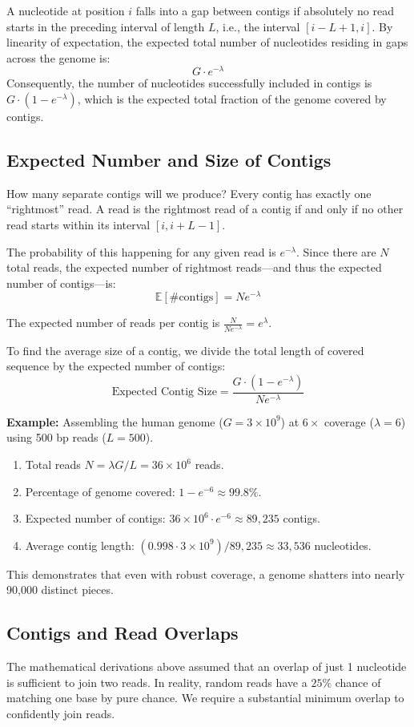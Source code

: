 A nucleotide at position $i$ falls into a gap between contigs if absolutely no read starts in the preceding interval of length $L$, i.e., the interval $[i-L+1, i]$. By linearity of expectation, the expected total number of nucleotides residing in gaps across the genome is:
\[ G \cdot e^{-\lambda} \]
Consequently, the number of nucleotides successfully included in contigs is $G \cdot (1 - e^{-\lambda})$, which is the expected total fraction of the genome covered by contigs.

\subsection{Expected Number and Size of Contigs}
How many separate contigs will we produce? Every contig has exactly one ``rightmost'' read. A read is the rightmost read of a contig if and only if no other read starts within its interval $[i, i+L-1]$.

The probability of this happening for any given read is $e^{-\lambda}$. Since there are $N$ total reads, the expected number of rightmost reads—and thus the expected number of contigs—is:
\[ \mathbb{E}[\#\text{contigs}] = N e^{-\lambda} \]

The expected number of reads per contig is $\frac{N}{N e^{-\lambda}} = e^\lambda$.

To find the average size of a contig, we divide the total length of covered sequence by the expected number of contigs:
\[ \text{Expected Contig Size} = \frac{G \cdot (1 - e^{-\lambda})}{N e^{-\lambda}} \]

\textbf{Example:} Assembling the human genome ($G = 3 \times 10^9$) at $6\times$ coverage ($\lambda = 6$) using 500 bp reads ($L=500$).
\begin{enumerate}
    \item Total reads $N = \lambda G / L = 36 \times 10^6$ reads.
    \item Percentage of genome covered: $1 - e^{-6} \approx 99.8\%$.
    \item Expected number of contigs: $36 \times 10^6 \cdot e^{-6} \approx 89,235$ contigs.
    \item Average contig length: $(0.998 \cdot 3 \times 10^9) / 89,235 \approx 33,536$ nucleotides.
\end{enumerate}
This demonstrates that even with robust coverage, a genome shatters into nearly 90,000 distinct pieces.

\subsection{Contigs and Read Overlaps}
The mathematical derivations above assumed that an overlap of just 1 nucleotide is sufficient to join two reads. In reality, random reads have a $25\%$ chance of matching one base by pure chance. We require a substantial minimum overlap to confidently join reads.

